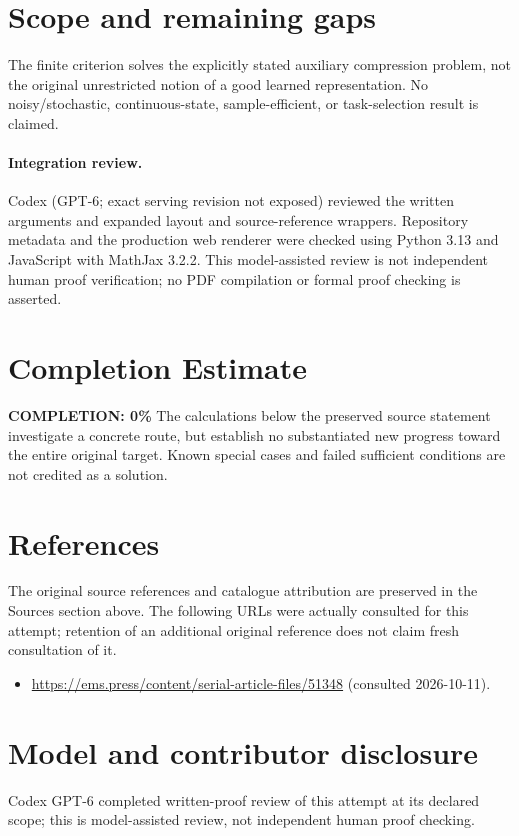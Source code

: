 \documentclass[11pt]{article}
\begin{document}
\section{Scope and remaining gaps}
The finite criterion solves the explicitly stated auxiliary compression problem, not the original unrestricted notion of a good learned representation. No noisy/stochastic, continuous-state, sample-efficient, or task-selection result is claimed.
\paragraph{Integration review.} Codex (GPT-6; exact serving revision not exposed) reviewed the written arguments and expanded layout and source-reference wrappers. Repository metadata and the production web renderer were checked using Python 3.13 and JavaScript with MathJax 3.2.2. This model-assisted review is not independent human proof verification; no PDF compilation or formal proof checking is asserted.

\section{Completion Estimate}
\noindent\textbf{COMPLETION: 0\%}
The calculations below the preserved source statement investigate a concrete route,
but establish no substantiated new progress toward the entire original target.
Known special cases and failed sufficient conditions are not credited as a solution.
\section{References}
The original source references and catalogue attribution are preserved in the
Sources section above. The following URLs were actually consulted for this attempt;
retention of an additional original reference does not claim fresh consultation of it.
\begin{itemize}
\item \url{https://ems.press/content/serial-article-files/51348} (consulted 2026-10-11). 
\end{itemize}
\section{Model and contributor disclosure}
Codex GPT-6 completed written-proof review of this attempt at its declared scope; this is model-assisted review, not independent human proof checking.
\end{document}
